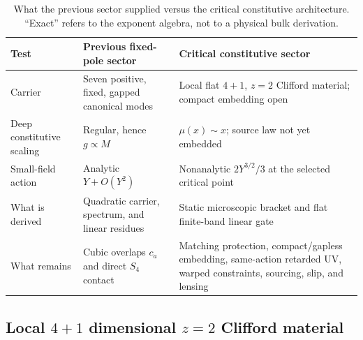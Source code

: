 \documentclass[10pt]{article}
\begin{document}
\begin{table}
 \centering
 \caption{What the previous sector supplied versus the critical constitutive
 architecture.  ``Exact'' refers to the exponent algebra, not to a physical
 bulk derivation.}
 \label{tab:oldversuscritical}
 \begin{tabular}{p{}p{}p{}}
  \toprule
  Test & Previous fixed-pole sector & Critical constitutive sector \\
  \midrule
  Carrier & Seven positive, fixed, gapped canonical modes &
  Local flat $4+1$, $z=2$ Clifford material; compact embedding open \\
  Deep constitutive scaling & Regular, hence $g\propto M$ &
  $\mu(x)\sim x$; source law not yet embedded \\
  Small-field action & Analytic $Y+O(Y^2)$ & Nonanalytic
  $2Y^{3/2}/3$ at the selected critical point \\
  What is derived & Quadratic carrier, spectrum, and linear residues &
  Static microscopic bracket and flat finite-band linear gate \\
  What remains & Cubic overlaps $c_a$ and direct $S_4$ contact & Matching
  protection, compact/gapless embedding, same-action retarded UV,
  warped constraints, sourcing, slip, and lensing \\
  \bottomrule
 \end{tabular}
\end{table}

\subsection{Local $4+1$ dimensional $z=2$ Clifford material}
\label{sec:z2cliffordbath}
\end{document}

